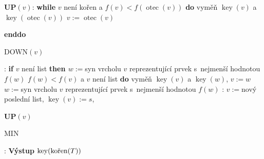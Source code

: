 \documentclass[a4paper,12pt]{article}
\DeclareMathOperator*{\otec}{otec}
\DeclareMathOperator*{\key}{key}
\begin{document}
{\bf UP$(v)$}:\newline 
{\bf while} $v$ není kořen a $f(v)<f(\otec(v))$ {\bf do\newline 
\phantom{{\rm ---}}}vyměň $\key(v)$ a $\key(\otec(v))$\newline 
\phantom{---}$v:=\otec(v)$\newline 
{\bf enddo

DOWN$(v)$}:\newline 
{\bf if} $v$ není list {\bf then\newline 
\phantom{{{\rm ---}}}$w:=$}syn vrcholu $v$ reprezentující prvek s~nejmenší 
hodnotou $f(w)$\newline 
\phantom{---}{\bf while} $f(w)<f(v)$ a $v$ není list {\bf do\newline 
\phantom{{\rm ------}}}vyměň $\key(v)$ a $\key(w)$, $v:=w$\newline 
\phantom{------}$w:=$syn vrcholu $v$ reprezentující prvek s~nejmenší 
hodnotou $f(w)$\newline 
\phantom{---}{\bf enddo\newline 
endif

INSERT$(s)$}:\newline 
$v:=$nový poslední list, $\key(v):=s$, {\bf UP$(v)$

MIN}:\newline 
{\bf Výstup} $\key(\text{\rm kořen}(T))$
\end{document}
